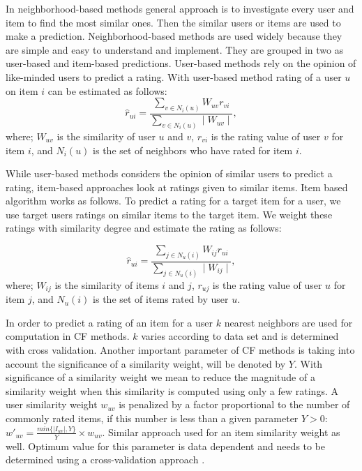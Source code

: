 \documentclass[conference]{IEEEtran}
\begin{document}
In neighborhood-based methods general approach is to investigate every user and 
item to find the most similar ones. Then the similar users or items are used to 
make a prediction. Neighborhood-based methods are used widely because they are 
simple and easy to understand and implement. They are grouped in two as user-based 
and item-based predictions. User-based methods rely on the opinion of like-minded 
users to predict a rating. With user-based method rating of a user $u$ on item $i$ 
can be estimated as follows:
\[
\hat{r}_{ui} = \frac{\sum\limits_{v \in N_i(u)} W_{uv}r_{vi}}{\sum\limits_{v \in N_i(u)} \mid W_{uv} \mid},
\]
where; $W_{uv}$ is the similarity of user $u$ and $v$, $r_{vi}$ is the rating value 
of user $v$ for item $i$, and $N_i(u)$ is the set of neighbors who have rated for  
item $i$.

While user-based methods considers the opinion of similar users to predict a rating, 
item-based approaches look at ratings given to similar items. Item based algorithm 
works as follows. To predict a rating for a target item for a user, we use target users
ratings on similar items to the target item. We weight these ratings with similarity 
degree and estimate the rating as follows:

\[
\hat{r}_{ui} = \frac{\sum\limits_{j \in N_u(i)} W_{ij}r_{ui}}{\sum\limits_{j \in N_u(i)} \mid W_{ij} \mid},
\]
where; $W_{ij}$ is the similarity of items $i$ and $j$, $r_{uj}$ is the rating value 
of user $u$ for item $j$, and $N_u(i)$ is the set of items rated by user $u$.

In order to predict a rating of an item for a user $k$ nearest neighbors are 
used for computation in CF methods. $k$ varies according to data set and is 
determined with cross validation. Another important parameter of CF methods 
is taking into account the significance of a similarity weight, will be denoted 
by $Y$. With significance of a similarity weight we mean to reduce the magnitude 
of a similarity weight when this similarity is computed using only a few 
ratings. A user similarity weight $w_{uv}$ is penalized by a factor proportional to the number 
of commonly rated items, if this number is less than a given parameter $Y > 0$:
$w'_{uv} = \frac {min\{|I_{uv}|, Y \} } Y \times w_{uv}$. Similar approach used for an item
similarity weight as well. Optimum value for this parameter is 
data dependent and needs to be determined using a cross-validation approach
 \cite{DBLP:reference/rsh/DesrosiersK11}.
\end{document}
